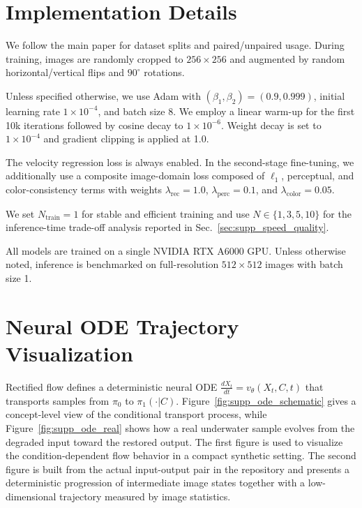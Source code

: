 \documentclass[runningheads]{llncs}
\begin{document}
\section{Implementation Details}
\label{sec:supp_impl}

We follow the main paper for dataset splits and paired/unpaired usage. During training, images are randomly cropped to $256\times 256$ and augmented by random horizontal/vertical flips and $90^\circ$ rotations.

Unless specified otherwise, we use Adam with $(\beta_1,\beta_2)=(0.9,0.999)$, initial learning rate $1\times 10^{-4}$, and batch size 8.
We employ a linear warm-up for the first 10k iterations followed by cosine decay to $1\times 10^{-6}$.
Weight decay is set to $1\times 10^{-4}$ and gradient clipping is applied at 1.0.

The velocity regression loss is always enabled. In the second-stage fine-tuning, we additionally use a composite image-domain loss composed of $\ell_1$, perceptual, and color-consistency terms with weights $\lambda_{\mathrm{rec}}=1.0$, $\lambda_{\mathrm{perc}}=0.1$, and $\lambda_{\mathrm{color}}=0.05$.

We set $N_{\mathrm{train}}=1$ for stable and efficient training and use $N\in\{1,3,5,10\}$ for the inference-time trade-off analysis reported in Sec.~\ref{sec:supp_speed_quality}.

All models are trained on a single NVIDIA RTX A6000 GPU. Unless otherwise noted, inference is benchmarked on full-resolution $512\times 512$ images with batch size 1.

\section{Neural ODE Trajectory Visualization}
\label{sec:supp_ode_vis}

Rectified flow defines a deterministic neural ODE $\frac{dX_t}{dt}=v_\theta(X_t,C,t)$ that transports samples from $\pi_0$ to $\pi_1(\cdot|C)$.
Figure~\ref{fig:supp_ode_schematic} gives a concept-level view of the conditional transport process, while Figure~\ref{fig:supp_ode_real} shows how a real underwater sample evolves from the degraded input toward the restored output. The first figure is used to visualize the condition-dependent flow behavior in a compact synthetic setting. The second figure is built from the actual input-output pair in the repository and presents a deterministic progression of intermediate image states together with a low-dimensional trajectory measured by image statistics.
\end{document}
